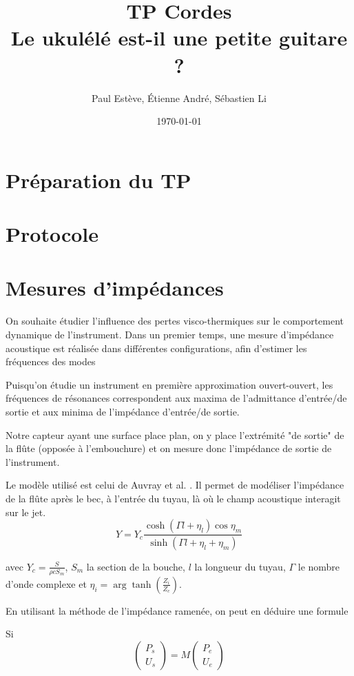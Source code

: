\documentclass[atiam, article]{rapport} %
\title{TP Cordes\\Le ukulélé est-il une petite guitare ?}
\author{Paul Estève, Étienne André, Sébastien Li} %
\date{\today}
\begin{document}
\maketitle


\section{Préparation du TP}


\section{Protocole}

\section{Mesures d'impédances}

On souhaite étudier l'influence des pertes visco-thermiques sur le comportement dynamique de l'instrument. Dans un premier temps, une mesure d'impédance acoustique est réalisée dans différentes configurations, afin d'estimer les fréquences des modes 

Puisqu'on étudie un instrument en première approximation ouvert-ouvert, les fréquences de résonances correspondent aux maxima de l'admittance d'entrée/de sortie et aux minima de l'impédance d'entrée/de sortie.

Notre capteur ayant une surface place plan, on y place l'extrémité "de sortie" de la flûte (opposée à l'embouchure) et on mesure donc l'impédance de sortie de l'instrument.

Le modèle utilisé est celui de Auvray et al. \cite{Auvray2011}. Il permet de modéliser l'impédance de la flûte après le bec, à l'entrée du tuyau, là où le champ acoustique interagit sur le jet.
$$Y=Y_c \frac{\cosh \left(\Gamma l+\eta_l\right) \cos \eta_m}{\sinh \left(\Gamma l+\eta_l+\eta_m\right)}$$

avec $Y_c = \frac{S}{\rho c S_m}$, $S_m$ la section de la bouche, $l$ la longueur du tuyau, $\Gamma$ le nombre d'onde complexe et $\eta_i = \arg \tanh\left(\frac{Z_i}{Z_c}\right)$.

En utilisant la méthode de l'impédance ramenée, on peut en déduire une formule

Si $$\begin{pmatrix}
    P_s\\U_s
\end{pmatrix} =
M
\begin{pmatrix}
    P_e\\U_e
\end{pmatrix}$$
\end{document}
